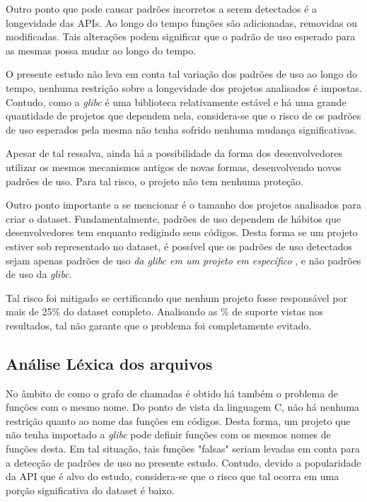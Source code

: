 Outro ponto que pode causar padrões incorretos a serem detectados é a
longevidade das APIs. Ao longo do tempo funções são adicionadas, removidas ou
modificadas. Tais alterações podem significar que o padrão de uso esperado para
as mesmas possa mudar ao longo do tempo.

O presente estudo não leva em conta tal variação dos padrões de uso ao longo do
tempo, nenhuma restrição sobre a longevidade dos projetos analisados é impostas.
Contudo, como a \textit{glibc} é uma biblioteca relativamente estável e há uma
grande quantidade de projetos que dependem nela, considera-se que o risco de os
padrões de uso esperados pela mesma não tenha sofrido nenhuma mudança
significativas. 

Apesar de tal ressalva, ainda há a possibilidade da forma dos desenvolvedores
utilizar os mesmos mecanismos antigos de novas formas, desenvolvendo novos
padrões de uso. Para tal risco, o projeto não tem nenhuma proteção.

Outro ponto importante a se mencionar é o tamanho dos projetos analisados para
criar o dataset. Fundamentalmente, padrões de uso dependem de hábitos que
desenvolvedores tem enquanto redigindo seus códigos. Desta forma se um projeto
estiver sob representado no dataset, é possível que os padrões de uso detectados
sejam apenas padrões de uso \textit{ da glibc em um projeto em específico }, e
não padrões de uso da \textit{glibc}.

Tal risco foi mitigado se certificando que nenhum projeto fosse responsável por
mais de 25\% do dataset completo. Analisando as \% de suporte vistas nos
resultados, tal não garante que o problema foi completamente evitado.

\subsection{Análise Léxica dos arquivos}
No âmbito de como o grafo de chamadas é obtido há também o problema de funções
com o mesmo nome. Do ponto de vista da linguagem C, não há nenhuma restrição
quanto ao nome das funções em códigos. Desta forma, um projeto que não tenha
importado a \textit{glibc} pode definir funções com os mesmos nomes de funções
desta. Em tal situação, tais funções "falsas" seriam levadas em conta para a
detecção de padrões de uso no presente estudo. Contudo, devido a popularidade da
API que é alvo do estudo, considera-se que o risco que tal ocorra em uma porção
significativa do dataset é baixo.
